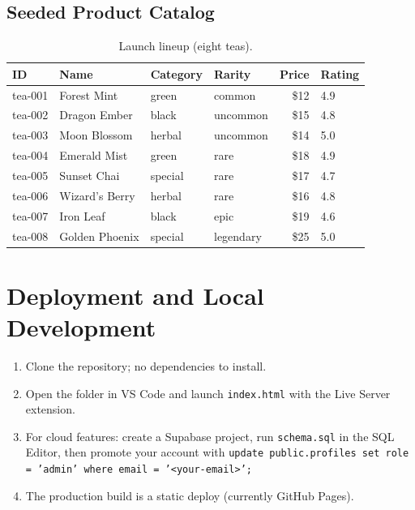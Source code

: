 \documentclass[11pt,a4paper]{article}
\begin{document}
\subsection{Seeded Product Catalog}

\begin{table}[h!]
\centering
\caption{Launch lineup (eight teas).}
\begin{tabular}{@{}llllr l@{}}
\toprule
\textbf{ID} & \textbf{Name} & \textbf{Category} & \textbf{Rarity} & \textbf{Price} & \textbf{Rating} \\
\midrule
tea-001 & Forest Mint    & green   & common    & \$12 & 4.9 \\
tea-002 & Dragon Ember   & black   & uncommon  & \$15 & 4.8 \\
tea-003 & Moon Blossom   & herbal  & uncommon  & \$14 & 5.0 \\
tea-004 & Emerald Mist   & green   & rare      & \$18 & 4.9 \\
tea-005 & Sunset Chai    & special & rare      & \$17 & 4.7 \\
tea-006 & Wizard's Berry & herbal  & rare      & \$16 & 4.8 \\
tea-007 & Iron Leaf      & black   & epic      & \$19 & 4.6 \\
tea-008 & Golden Phoenix & special & legendary & \$25 & 5.0 \\
\bottomrule
\end{tabular}
\end{table}


\section{Deployment and Local Development}

\begin{enumerate}[nosep]
    \item Clone the repository; no dependencies to install.
    \item Open the folder in VS Code and launch \texttt{index.html} with
          the Live Server extension.
    \item For cloud features: create a Supabase project, run
          \texttt{schema.sql} in the SQL Editor, then promote your account
          with
          \texttt{update public.profiles set role = 'admin' where
          email = '<your-email>';}
    \item The production build is a static deploy (currently GitHub
          Pages).
\end{enumerate}
\end{document}
